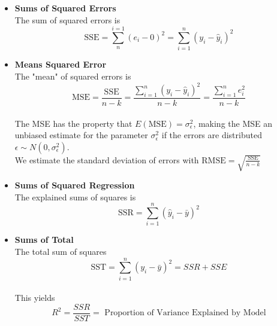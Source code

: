 \documentclass{article}
\begin{document}
  \begin{itemize}
    \item \textbf{Sums of Squared Errors}
    \\ The sum of squared errors is
      $$\text{SSE} = \sum_{n}^{i=1}(e_i-0)^2=\sum_{i=1}^{n}(y_i-\hat{y}_i)^2$$
    \item \textbf{Means Squared Error}
    \\ The "mean" of squared errors is
      $$\text{MSE}=\frac{\text{SSE}}{n-k}=\frac{\sum_{i=1}^{n}(y_i-\hat{y}_i)^2}{n-k}=\frac{\sum_{i=1}^{n}e^2_i}{n-k}$$
    \\ The MSE has the property that $E(\text{MSE})=\sigma^2_\epsilon$, making the MSE an unbiased estimate for the parameter $\sigma^2_\epsilon$ if the errors are distributed $\epsilon \sim N(0,\sigma^2_\epsilon)$.
    \\ We estimate the standard deviation of errors with $\text{RMSE} = \sqrt{\frac{\text{SSE}}{n-k}}$
    \item \textbf{Sums of Squared Regression}
    \\ The explained sums of squares is
    $$\text{SSR}=\sum_{i=1}^{n}(\hat{y}_i-\bar{y})^2$$
    \item \textbf{Sums of Total}
    \\ The total sum of squares
    $$\text{SST}=\sum_{i=1}^{n}(y_i-\bar{y})^2=SSR+SSE$$
    \\ This yields
    $$R^2=\frac{SSR}{SST}= \text{ Proportion of Variance Explained by Model}$$
  \end{itemize}
\end{document}
